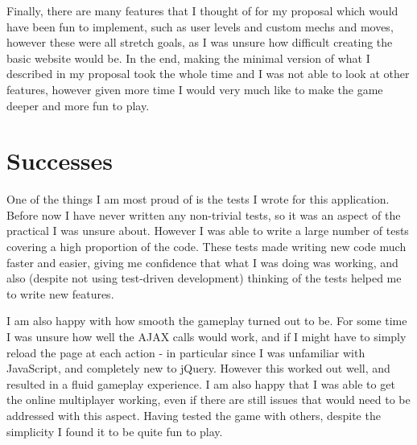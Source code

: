 \documentclass{article}
\begin{document}
Finally, there are many features that I thought of for my proposal which would have been fun to implement, such as user levels and custom mechs and moves, however these were all stretch goals, as I was unsure how difficult creating the basic website would be. In the end, making the minimal version of what I described in my proposal took the whole time and I was not able to look at other features, however given more time I would very much like to make the game deeper and more fun to play.

\section{Successes}

One of the things I am most proud of is the tests I wrote for this application. Before now I have never written any non-trivial tests, so it was an aspect of the practical I was unsure about. However I was able to write a large number of tests covering a high proportion of the code. These tests made writing new code much faster and easier, giving me confidence that what I was doing was working, and also (despite not using test-driven development) thinking of the tests helped me to write new features.

I am also happy with how smooth the gameplay turned out to be. For some time I was unsure how well the AJAX calls would work, and if I might have to simply reload the page at each action - in particular since I was unfamiliar with JavaScript, and completely new to jQuery. However this worked out well, and resulted in a fluid gameplay experience. I am also happy that I was able to get the online multiplayer working, even if there are still issues that would need to be addressed with this aspect. Having tested the game with others, despite the simplicity I found it to be quite fun to play.

\end{document}
